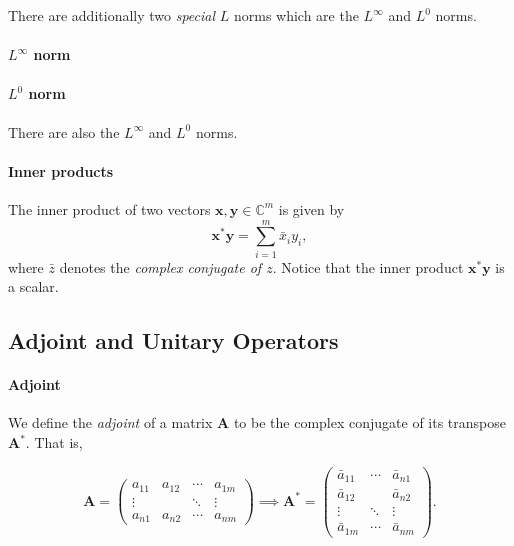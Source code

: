 \documentclass[12pt]{article}
\newcommand{\bbC}{\mathbb{C}}
\renewcommand{\vec}[1]{\mathbf{#1}}
\theoremstyle{definition}
\theoremstyle{remark}
\numberwithin{equation}{section}
\begin{document}
There are additionally two \emph{special} $L$ norms which are the $L^\infty$ and $L^0$ norms.


\paragraph{$L^\infty$ norm}

\paragraph{$L^0$ norm}

There are also the $L^\infty$ and $L^0$ norms.

\paragraph{Inner products}%
\label{par:inner_products}


The inner product of two vectors $\vec{x}, \vec{y} \in \bbC^{m}$ is given by 
\begin{equation}
  \vec{x}^*\vec{y} = \sum_{i=1}^{m} \bar{x}_i y_i,
\end{equation}
where $\bar{z}$ denotes the \emph{complex conjugate of $z$}.   Notice that the inner product $\vec{x}^*\vec{y}$ is a scalar.

\subsection{Adjoint and Unitary Operators}%
\label{sub:adjoint_and_unitary_operators}

\paragraph{Adjoint}

We define the \emph{adjoint} of a matrix $\vec{A}$ to be the complex conjugate of its transpose $\vec{A}^*$. That is,

\begin{equation}
  \vec{A} = \begin{pmatrix}
    a_{11} & a_{12} & \cdots & a_{1m} \\
    \vdots &        & \ddots & \vdots \\
    a_{n1} & a_{n2} & \cdots & a_{nm}
  \end{pmatrix} \implies
  \vec{A}^* = \begin{pmatrix}
    \bar{a}_{11} & \cdots & \bar{a}_{n1} \\
    \bar{a}_{12} &        & \bar{a}_{n2} \\
    \vdots       & \ddots & \vdots \\
    \bar{a}_{1m} & \cdots & \bar{a}_{nm}
  \end{pmatrix}. 
\end{equation}
\end{document}
